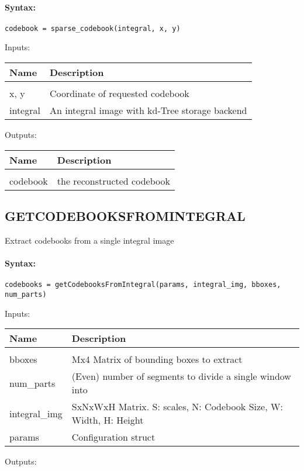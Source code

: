 \paragraph{Syntax:} \verb|codebook = sparse_codebook(integral, x, y)|

Inputs:

\begin{tabular}{|l|p{5cm}|}
\hline
\textbf{Name} & \textbf{Description} \\
\hline \hline \\
x, y & Coordinate of requested codebook  \\ \hline
integral & An integral image with kd-Tree storage backend  \\ \hline
\end{tabular}
Outputs:

\begin{tabular}{|l|p{5cm}|}
\hline
\textbf{Name} & \textbf{Description} \\
\hline \hline \\
codebook & the reconstructed codebook  \\ \hline
\end{tabular}

\subsection{GETCODEBOOKSFROMINTEGRAL}

Extract codebooks from a single integral image

\paragraph{Syntax:} \verb|codebooks = getCodebooksFromIntegral(params, integral_img, bboxes, num_parts)|

Inputs:

\begin{tabular}{|l|p{5cm}|}
\hline
\textbf{Name} & \textbf{Description} \\
\hline \hline \\
bboxes & Mx4 Matrix of bounding boxes to extract  \\ \hline
num\_parts & (Even) number of segments to divide a single window into  \\ \hline
integral\_img & SxNxWxH Matrix. S: scales, N: Codebook Size, W: Width, H: Height  \\ \hline
params & Configuration struct  \\ \hline
\end{tabular}
Outputs:

